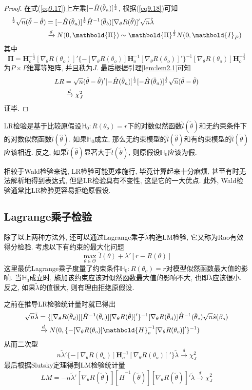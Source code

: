 \documentclass[cn, 12pt, math=mtpro2, bibstyle=apa, blue, twocol]{elegantbook}
\newcommand{\HH}{\mathbb{H}}
\newcommand{\hth}{\hat{\theta}}
\newcommand{\overbar}[1]{\mkern 1.5mu\overline{\mkern-1.5mu#1\mkern-1.5mu}\mkern 1.5mu}
\begin{document}
\begin{proof}
  在式(\ref{eq9.17})上左乘$[-\hat{H}(\overbar{\theta}_a)]^{\frac{1}{2}}$, 根据(\ref{eq9.18})可知
  \begin{align}
  [-\hat{H}(\overbar{\theta}_a)]^{\frac{1}{2}}\sqrt{n}(\tilde{\theta}-\hth)&=[-\hat{H}(\overbar{\theta}_a)]^{\frac{1}{2}}\hat{H}^{-1}(\overbar{\theta}_b)[\nabla_\theta R(\tilde{\theta})]'\sqrt{n}\tilde{\lambda} \nonumber \\
  &\xrightarrow{d} N(0,\mathbold{\Pi})\sim\mathbold{\Pi}^{\frac{1}{2}}N(0,\mathbold{I}_P) \label{eq9.19}
  \end{align}
  其中
  $$\mathbold{\Pi}=\mathbold{H}_o^{-\frac{1}{2}}[\nabla_\theta R(\theta_o)]'\{-[\nabla_\theta R(\theta_o)]\mathbold{H}_o^{-1}[\nabla_\theta R(\theta_o)]'\}^{-1}[\nabla_\theta R(\theta_o)]\mathbold{H}_o^{-\frac{1}{2}}$$
  为$P\times P$维幂等矩阵, 并且秩为$J$. 最后根据引理\ref{lem:lem2.1}可知
  \begin{align*}
  LR&=\sqrt{n}(\tilde{\theta}-\hat{\theta})'[-\hat{H}(\overbar{\theta}_a)]^{\frac{1}{2}}[-\hat{H}(\overbar{\theta}_a)]^{\frac{1}{2}}\sqrt{n}(\tilde{\theta}-\hth) \\
  &\xrightarrow{d}\chi_J^2
  \end{align*}
  证毕.
\end{proof}
LR检验是基于比较原假设$\HH_0: R(\theta_o)=r$下的对数似然函数$\hat{l}(\tilde{\theta})$和无约束条件下的对数似然函数$\hat{l}(\hth)$. 如果$\HH_0$成立, 那么无约束模型的$\hat{l}(\hth)$和有约束模型的$\hat{l}(\tilde{\theta})$应该相近. 反之, 如果$\hat{l}(\hth)$显著大于$\hat{l}(\tilde{\theta})$, 则原假设$\HH_0$应该为假.

相较于Wald检验来说, LR检验可能更难施行, 毕竟计算起来十分麻烦, 甚至有时无法解析地得到表达式, 但是LR检验具有不变性, 这是它的一大优点. 此外, Wald检验通常比LR检验更容易拒绝原假设.
\subsection{Lagrange乘子检验}
除了以上两种方法外, 还可以通过Lagrange乘子$\tilde{\lambda}$构造LM检验, 它又称为Rao有效得分检验. 考虑以下有约束的最大化问题
$$\max_{\theta\in\Theta}\,\hat{l}(\theta)+\lambda'[r-R(\theta)]$$
这里最优Lagrange乘子度量了约束条件$\HH_0: R(\theta_o)=r$对模型似然函数最大值的影响. 当$\HH_0$成立时, 施加该约束应该对似然函数最大值的影响不大, 也即$\tilde{\lambda}$应该很小. 反之, 如果$\tilde{\lambda}$的值很大, 则有理由拒绝原假设.

之前在推导LR检验统计量时就已得出
\begin{align*}
\sqrt{n}\tilde{\lambda}&=\{[\nabla_\theta R(\overbar{\theta}_d)][\hat{H}^{-1}(\overbar{\theta}_c)][\nabla_\theta R(\tilde{\theta})]'\}^{-1}[\nabla_\theta R(\overbar{\theta}_d)]\hat{H}^{-1}(\overbar{\theta}_c)\sqrt{n}\hat{s}(\beta_o) \nonumber \\
  &\xrightarrow{d}N(0,\{-[\nabla_\theta R(\theta_o)]\mathbold{H}_o^{-1}[\nabla_\theta R(\theta_o)]'\}^{-1})
\end{align*}
从而二次型
$$n\tilde{\lambda}'\{-[\nabla_\theta R(\theta_o)]\mathbold{H}_o^{-1}[\nabla_\theta R(\theta_o)]'\}\tilde{\lambda}\xrightarrow{d}\chi_J^2$$
最后根据Slutsky定理得到LM检验统计量
$$LM=-n\tilde{\lambda}'[\nabla_\theta R(\tilde{\theta})][\hat{H}^{-1}(\tilde{\theta})][\nabla_\theta R(\tilde{\theta})]'\tilde{\lambda}\xrightarrow{d}\chi_J^2$$
\end{document}
